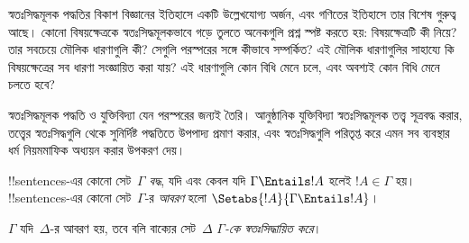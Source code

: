 \documentclass[../../../include/open-logic-section]{subfiles}
\begin{document}

\begin{explain}
স্বতঃসিদ্ধমূলক পদ্ধতির বিকাশ বিজ্ঞানের ইতিহাসে একটি উল্লেখযোগ্য অর্জন,
এবং গণিতের ইতিহাসে তার বিশেষ গুরুত্ব আছে। কোনো বিষয়ক্ষেত্রকে
স্বতঃসিদ্ধমূলকভাবে গড়ে তুলতে অনেকগুলি প্রশ্ন স্পষ্ট করতে হয়:
বিষয়ক্ষেত্রটি কী নিয়ে? তার সবচেয়ে মৌলিক ধারণাগুলি কী? সেগুলি পরস্পরের
সঙ্গে কীভাবে সম্পর্কিত? এই মৌলিক ধারণাগুলির সাহায্যে কি বিষয়ক্ষেত্রের
সব ধারণা সংজ্ঞায়িত করা যায়? এই ধারণাগুলি কোন বিধি মেনে চলে, এবং
অবশ্যই কোন বিধি মেনে চলতে হবে?

স্বতঃসিদ্ধমূলক পদ্ধতি ও যুক্তিবিদ্যা যেন পরস্পরের জন্যই তৈরি।
আনুষ্ঠানিক যুক্তিবিদ্যা স্বতঃসিদ্ধমূলক তত্ত্ব সূত্রবদ্ধ করার, তত্ত্বের
স্বতঃসিদ্ধগুলি থেকে সুনির্দিষ্ট পদ্ধতিতে উপপাদ্য প্রমাণ করার, এবং
স্বতঃসিদ্ধগুলি পরিতৃপ্ত করে এমন সব ব্যবস্থার ধর্ম নিয়মমাফিক অধ্যয়ন
করার উপকরণ দেয়।
\end{explain}

\begin{defn}
!!{sentence}s-এর কোনো সেট~$\Gamma$ \emph{বদ্ধ}, যদি এবং কেবল যদি
$\Gamma \Entails !A$ হলেই $!A \in \Gamma$ হয়। !!{sentence}s-এর
কোনো সেট~$\Gamma$-র \emph{আবরণ} হলো
$\Setabs{!A}{\Gamma \Entails !A}$।

$\Gamma$ যদি~$\Delta$-র আবরণ হয়, তবে বলি বাক্যের
সেট~$\Delta$ \emph{$\Gamma$-কে স্বতঃসিদ্ধায়িত করে}।
\end{defn}
\end{document}
